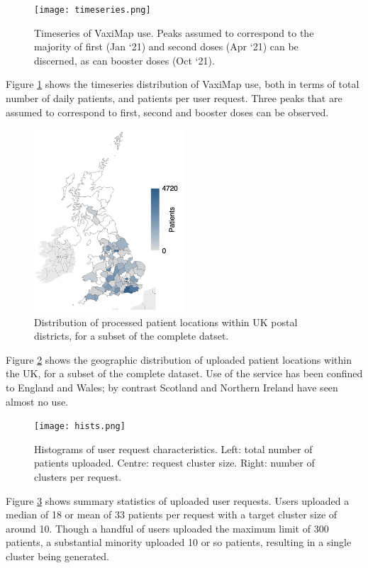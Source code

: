 \documentclass[review]{elsarticle}
\def\vm{VaxiMap}
\begin{document}
\begin{figure}[H]
\centering
\texttt{[image: timeseries.png]}
\caption{Timeseries of \vm{} use. Peaks assumed to correspond to the majority of first (Jan `21) and second doses (Apr `21) can be discerned, as can booster doses (Oct `21).}
\label{timeseries}
\end{figure}

Figure \ref{timeseries} shows the timeseries distribution of \vm{} use, both in terms of total number of daily patients, and patients per user request. Three peaks that are assumed to correspond to first, second and booster doses can be observed. 

\begin{figure}[H]
\centering
\includegraphics[width=0.5\textwidth]{uk_overview.png}
\caption{Distribution of processed patient locations within UK postal districts, for a subset of the complete datset.}
\label{uk_overview}
\end{figure}

Figure \ref{uk_overview} shows the geographic distribution of uploaded patient locations within the UK, for a subset of the complete dataset. Use of the service has been confined to England and Wales; by contrast Scotland and Northern Ireland have seen almost no use.  

\begin{figure}[H]
\centering
\texttt{[image: hists.png]}
\caption{Histograms of user request characteristics. Left: total number of patients uploaded. Centre: request cluster size. Right: number of clusters per request.}
\label{hists}
\end{figure}

Figure \ref{hists} shows summary statistics of uploaded user requests. Users uploaded a median of 18 or mean of 33 patients per request with a target cluster size of around 10. Though a handful of users uploaded the maximum limit of 300 patients, a substantial minority uploaded 10 or so patients, resulting in a single cluster being generated. 
\end{document}
